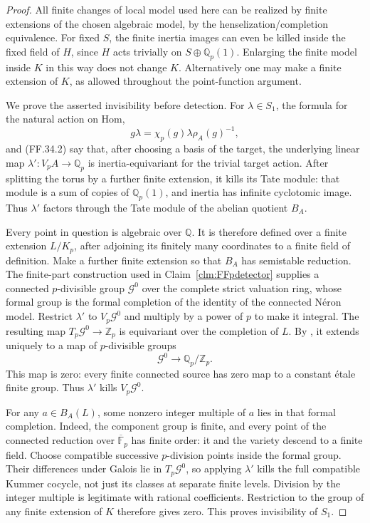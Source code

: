 \begin{proof}
All finite changes of local model used here can be
realized by finite extensions of the chosen algebraic
model, by the henselization/completion equivalence.
For fixed \(S\), the finite inertia images can even
be killed inside the fixed field of \(H\), since
\(H\) acts trivially on \(S\oplus\mathbb Q_p(1)\).
Enlarging the finite model inside \(K\) in this way
does not change \(K\). Alternatively one may make
a finite extension of \(K\), as allowed throughout
the point-function argument.

We prove the asserted invisibility before detection.
For \(\lambda\in S_1\), the formula for the natural
action on Hom,
\[
        g\lambda=\chi_p(g)\lambda\rho_A(g)^{-1},
\]
and (FF.34.2) say that, after choosing a basis of
the target, the underlying linear map
\(\lambda':V_pA\to\mathbb Q_p\) is inertia-equivariant
for the trivial target action. After splitting the
torus by a further finite extension, it kills its
Tate module: that module is a sum of copies of
\(\mathbb Q_p(1)\), and inertia has infinite
cyclotomic image. Thus \(\lambda'\) factors through
the Tate module of the abelian quotient \(B_A\).

Every point in question is algebraic over \(\mathbb Q\).
It is therefore defined over a finite extension \(L/K_p\),
after adjoining its finitely many coordinates to a
finite field of definition. Make a further finite
extension so that \(B_A\) has semistable reduction.
The finite-part construction used in
Claim~\ref{clm:FFpdetector} supplies a connected
\(p\)-divisible group \(\mathcal G^0\) over the
complete strict valuation ring, whose formal group
is the formal completion of the identity of the
connected N\'eron model. Restrict \(\lambda'\) to
\(V_p\mathcal G^0\) and multiply by a power of \(p\)
to make it integral. The resulting map
\(T_p\mathcal G^0\to\mathbb Z_p\) is equivariant
over the completion of \(L\). By
\citet[Theorem~4 and Corollary~1]{FF_Tate1967}, it
extends uniquely to a map of \(p\)-divisible groups
\[
                  \mathcal G^0\longrightarrow\mathbb Q_p/\mathbb Z_p.
\]
This map is zero: every finite connected source
has zero map to a constant \'etale finite group.
Thus \(\lambda'\) kills \(V_p\mathcal G^0\).

For any \(a\in B_A(L)\), some nonzero integer
multiple of \(a\) lies in that formal completion.
Indeed, the component group is finite, and every
point of the connected reduction over
\(\overline{\mathbb F}_p\) has finite order:
it and the variety descend to a finite field.
Choose compatible successive \(p\)-division points
inside the formal group. Their differences under
Galois lie in \(T_p\mathcal G^0\), so applying
\(\lambda'\) kills the full compatible Kummer
cocycle, not just its classes at separate finite
levels. Division by the integer multiple is
legitimate with rational coefficients. Restriction
to the group of any finite extension of \(K\)
therefore gives zero. This proves invisibility
of \(S_1\).


\end{proof}
